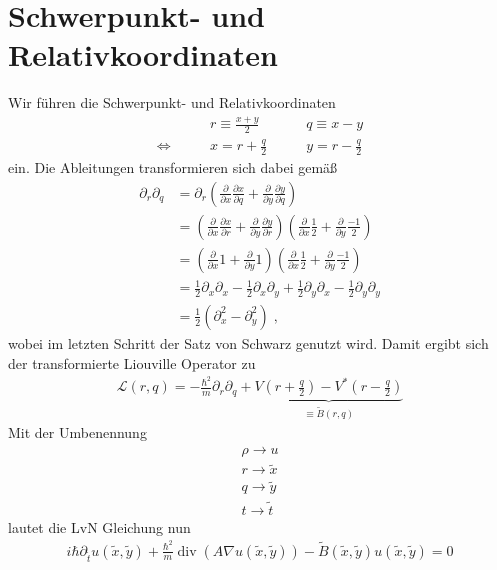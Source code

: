 \section{Schwerpunkt- und Relativkoordinaten}
Wir führen die Schwerpunkt- und Relativkoordinaten
\begin{align}
  &r \equiv \frac{x+y}{2} \qquad &q \equiv x-y \label{eq:gedrehteKoordinaten}\\
  \Leftrightarrow\qquad &x = r+\frac{q}{2} \qquad &y = r-\frac{q}{2}
\end{align}
ein. Die Ableitungen transformieren sich dabei gemäß
\begin{align}
  \partial_r \partial_q  &= \partial_r \left( \frac{\partial}{\partial x} \frac{\partial x}{\partial q} + \frac{\partial}{\partial y} \frac{\partial y}{\partial q}\right) \\
   &= \left( \frac{\partial}{\partial x} \frac{\partial x}{\partial r} + \frac{\partial}{\partial y} \frac{\partial y}{\partial r}\right) \left( \frac{\partial}{\partial x} \frac{1}{2} + \frac{\partial}{\partial y} \frac{-1}{2}\right)\\
    &= \left( \frac{\partial}{\partial x} 1 + \frac{\partial}{\partial y} 1\right) \left( \frac{\partial}{\partial x} \frac{1}{2} + \frac{\partial}{\partial y} \frac{-1}{2}\right)\\
   &= \frac{1}{2}\partial_x \partial_x - \frac{1}{2}\partial_x \partial_y + \frac{1}{2}\partial_y \partial_x - \frac{1}{2}\partial_y \partial_y \\
  &=  \frac{1}{2}(\partial_x^2 - \partial_y^2) \; ,
\end{align}
wobei im letzten Schritt der Satz von Schwarz genutzt wird. Damit ergibt sich der transformierte Liouville Operator zu
\begin{align}
  \mathcal{L}(r,q) = -\frac{\hbar^2}{m} \partial_r\partial_q + \underbrace{V\left(r+\frac{q}{2}\right) - V^*\left(r-\frac{q}{2}\right)}_{\equiv \tilde{B}(r,q)}
\end{align}
Mit der Umbenennung
\begin{align*}
  \rho \longrightarrow u \\
  r \longrightarrow \tilde{x} \\
  q \longrightarrow \tilde{y} \\
  t \longrightarrow \tilde{t}
\end{align*}
lautet die LvN Gleichung nun
\begin{align}
  i\hbar\partial_{\tilde{t}} u(\tilde{x},\tilde{y})+\frac{\hbar^2}{m}\operatorname{div}(A\nabla u(\tilde{x},\tilde{y})) -  \tilde{B}(\tilde{x},\tilde{y}) u(\tilde{x},\tilde{y}) = 0
\end{align}

